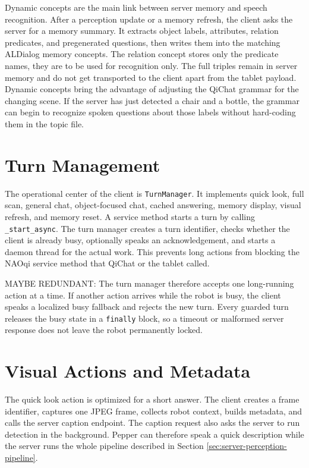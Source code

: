 Dynamic concepts are the main link between server memory and speech recognition. After a perception update or a memory refresh, the client asks the server for a memory summary. It extracts object labels, attributes, relation predicates, and pregenerated questions, then writes them into the matching ALDialog memory concepts. The relation concept stores only the predicate names, they are to be used for recognition only. The full triples remain in server memory and do not get transported to the client apart from the tablet payload. Dynamic concepts bring the advantage of adjusting the QiChat grammar for the changing scene. If the server has just detected a chair and a bottle, the grammar can begin to recognize spoken questions about those labels without hard-coding them in the topic file.

\section{Turn Management}\label{sec:client-turn-management}

The operational center of the client is \texttt{TurnManager}. It implements quick look, full scan, general chat, object-focused chat, cached answering, memory display, visual refresh, and memory reset. A service method starts a turn by calling \texttt{\_start\_async}. The turn manager creates a turn identifier, checks whether the client is already busy, optionally speaks an acknowledgement, and starts a daemon thread for the actual work. This prevents long actions from blocking the NAOqi service method that QiChat or the tablet called.

MAYBE REDUNDANT: The turn manager therefore accepts one long-running action at a time. If another action arrives while the robot is busy, the client speaks a localized busy fallback and rejects the new turn. Every guarded turn releases the busy state in a \texttt{finally} block, so a timeout or malformed server response does not leave the robot permanently locked.

\section{Visual Actions and Metadata}\label{sec:client-visual-actions}

The quick look action is optimized for a short answer. The client creates a frame identifier, captures one JPEG frame, collects robot context, builds metadata, and calls the server caption endpoint. The caption request also asks the server to run detection in the background. Pepper can therefore speak a quick description while the server runs the whole pipeline described in Section \ref{sec:server-perception-pipeline}.

